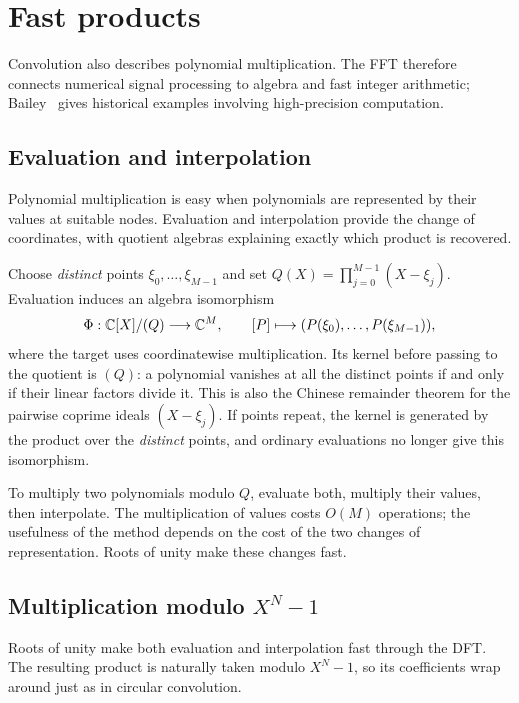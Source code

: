 \section{Fast products}
\label{sect1-calculations-products}
Convolution also describes polynomial multiplication. The FFT therefore
connects numerical signal processing to algebra and fast integer arithmetic;
Bailey~\cite{bailey-pi} gives historical examples involving high-precision
computation.

\subsection{Evaluation and interpolation}
\label{sect2-presentation-theoretical}

Polynomial multiplication is easy when polynomials are represented by their
values at suitable nodes. Evaluation and interpolation provide the change of
coordinates, with quotient algebras explaining exactly which product is
recovered.

Choose \emph{distinct} points $\xi_0,\ldots,\xi_{M-1}$ and set
$Q(X)=\prod_{j=0}^{M-1}(X-\xi_j)$. Evaluation induces an algebra isomorphism
\[
 \Phi:\mathbb{C}[X]/(Q)\longrightarrow\mathbb{C}^M,
 \qquad [P]\longmapsto(P(\xi_0),\ldots,P(\xi_{M-1})),
\]
where the target uses coordinatewise multiplication. Its kernel before
passing to the quotient is $(Q)$: a polynomial vanishes at all the distinct
points if and only if their linear factors divide it. This is also the
Chinese remainder theorem for the pairwise coprime ideals $(X-\xi_j)$.
If points repeat, the kernel is generated by the product over the
\emph{distinct} points, and ordinary evaluations no longer give this isomorphism.

To multiply two polynomials modulo $Q$, evaluate both, multiply their values,
then interpolate. The multiplication of values costs $O(M)$ operations;
the usefulness of the method depends on the cost of the two changes of
representation. Roots of unity make these changes fast.

\subsection{Multiplication modulo \texorpdfstring{$X^N-1$}{X\^N-1}}
\label{sect2-multiplication-polynomials-modulo-xn-1}

Roots of unity make both evaluation and interpolation fast through the DFT.
The resulting product is naturally taken modulo $X^N-1$, so its coefficients
wrap around just as in circular convolution.

